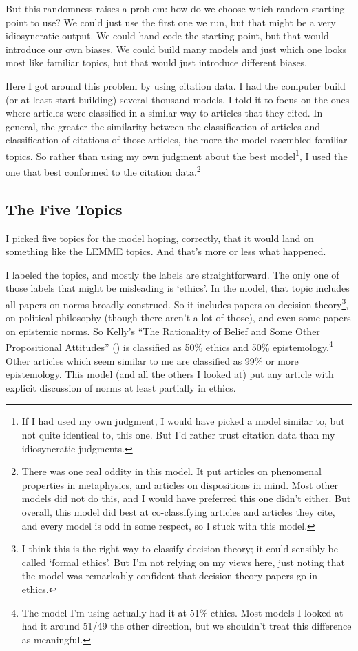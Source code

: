 \documentclass[
  10pt,
  letterpaper,
  DIV=11,
  numbers=noendperiod,
  twoside]{scrartcl}
\begin{document}
But this randomness raises a problem: how do we choose which random
starting point to use? We could just use the first one we run, but that
might be a very idiosyncratic output. We could hand code the starting
point, but that would introduce our own biases. We could build many
models and just which one looks most like familiar topics, but that
would just introduce different biases.

Here I got around this problem by using citation data. I had the
computer build (or at least start building) several thousand models. I
told it to focus on the ones where articles were classified in a similar
way to articles that they cited. In general, the greater the similarity
between the classification of articles and classification of citations
of those articles, the more the model resembled familiar topics. So
rather than using my own judgment about the best model\footnote{If I had
  used my own judgment, I would have picked a model similar to, but not
  quite identical to, this one. But I'd rather trust citation data than
  my idiosyncratic judgments.}, I used the one that best conformed to
the citation data.\footnote{There was one real oddity in this model. It
  put articles on phenomenal properties in metaphysics, and articles on
  dispositions in mind. Most other models did not do this, and I would
  have preferred this one didn't either. But overall, this model did
  best at co-classifying articles and articles they cite, and every
  model is odd in some respect, so I stuck with this model.}

\subsection{The Five Topics}\label{sec-five-topics}

I picked five topics for the model hoping, correctly, that it would land
on something like the LEMME topics. And that's more or less what
happened.

I labeled the topics, and mostly the labels are straightforward. The
only one of those labels that might be misleading is `ethics'. In the
model, that topic includes all papers on norms broadly construed. So it
includes papers on decision theory\footnote{I think this is the right
  way to classify decision theory; it could sensibly be called `formal
  ethics'. But I'm not relying on my views here, just noting that the
  model was remarkably confident that decision theory papers go in
  ethics.}, on political philosophy (though there aren't a lot of
those), and even some papers on epistemic norms. So Kelly's ``The
Rationality of Belief and Some Other Propositional Attitudes''
() is classified as 50\%
ethics and 50\% epistemology.\footnote{The model I'm using actually had
  it at 51\% ethics. Most models I looked at had it around 51/49 the
  other direction, but we shouldn't treat this difference as meaningful.}
Other articles which seem similar to me are classified as 99\% or more
epistemology. This model (and all the others I looked at) put any
article with explicit discussion of norms at least partially in ethics.
\end{document}
